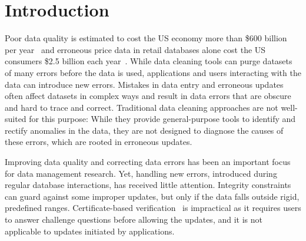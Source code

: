 
\section{Introduction}
\label{s:intro}

Poor data quality is estimated to cost the US economy more than \$600 billion
per year~\cite{eckerson2002} and erroneous price data in retail databases
alone cost the US consumers \$2.5 billion each year~\cite{Fan2008}. 
While data cleaning tools can purge datasets of many errors before the data is
used, applications and users interacting with the data can introduce new
errors. Mistakes in data entry and erroneous updates often affect datasets in
complex ways and result in data errors that are obscure and hard to trace and
correct. Traditional data cleaning approaches are not well-suited for this
purpose: While they provide general-purpose tools to identify and rectify
anomalies in the data, they are not designed to diagnose the causes of these
errors, which are rooted in erroneous updates.

Improving data quality and correcting data errors has been an important focus
for data management research. Yet, handling new errors, introduced during
regular database interactions, has received little attention. Integrity
constraints~\cite{Khoussainova2006} can guard against some improper updates,
but only if the data falls outside rigid, predefined ranges. Certificate-based
verification~\cite{Chen2011} is impractical as it requires users to answer
challenge questions before allowing the updates, and it is not applicable to
updates initiated by applications.


